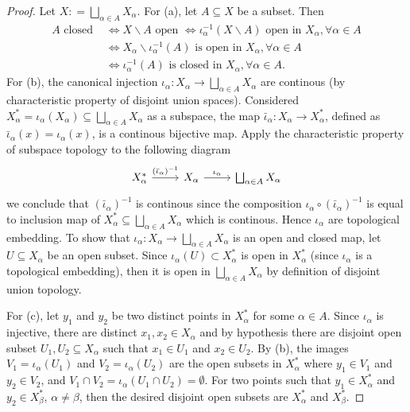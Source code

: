 \documentclass[a4paper]{article}
\theoremstyle{remark}
\newcommand{\subhim}{\subseteq} %
\begin{document}
\begin{proof}
	Let $X: = \bigsqcup_{\alpha \in A} X_{\alpha}$. For (a), let $A \subhim X$ be a subset. Then
	\begin{align*}
	A \text{ closed } &\Leftrightarrow X \smallsetminus A \text{ open } \Leftrightarrow \iota_{\alpha}^{-1}(X \smallsetminus A) \text{ open in }X_{\alpha}, \forall \alpha \in A  \\ &\Leftrightarrow X_{\alpha}\smallsetminus \iota_{\alpha}^{-1}(A) \text{ is open in }X_{\alpha}, \forall \alpha \in A \\
	&\Leftrightarrow \iota_{\alpha}^{-1}(A) \text{ is closed in }X_{\alpha}, \forall \alpha \in A.
	\end{align*}
	For (b), the canonical injection $\iota_{\alpha} : X_{\alpha} \to \bigsqcup_{\alpha \in A} X_{\alpha}$ are continous (by characteristic property of disjoint union spaces). Considered $X_{\alpha}^* = \iota_{\alpha} (X_{\alpha}) \subhim \bigsqcup_{\alpha \in A} X_{\alpha}$ as a subspace, the map $\bar{\iota}_{\alpha} : X_{\alpha} \to X_{\alpha}^*$, defined as $\bar{\iota}_{\alpha} (x) = \iota_{\alpha}(x)$, is a continous bijective map. Apply the characteristic property of subspace topology to the following diagram
	\[
	\begin{tikzcd}
	X^*_{\alpha} \arrow[r,"(\bar{\iota}_{\alpha})^{-1}"] &  X_{\alpha} \arrow[r,"\iota_{\alpha}"] & \bigsqcup_{\alpha \in A} X_{\alpha}
	\end{tikzcd}
	\]
	we conclude that $(\bar{\iota}_{\alpha})^{-1}$ is continous since the composition $\iota_{\alpha} \circ (\bar{\iota}_{\alpha})^{-1}$ is equal to inclusion map of $X^*_{\alpha} \subhim \bigsqcup_{\alpha \in A} X_{\alpha}$ which is continous. Hence $\iota_{\alpha}$ are topological embedding. To show that $\iota_{\alpha} : X_{\alpha} \to \bigsqcup_{\alpha \in A} X_{\alpha}$ is an open and closed map, let $U\subhim X_{\alpha}$ be an open subset. Since $\iota_{\alpha}(U) \subset X_{\alpha}^*$ is open in $X_{\alpha}^*$ (since $\iota_{\alpha}$ is a topological embedding), then it is open in $\bigsqcup_{\alpha \in A} X_{\alpha}$ by definition of disjoint union topology.   
	
	For (c),  let $y_1$ and $y_2$ be two distinct points in $X_{\alpha}^*$ for some $\alpha \in A$. Since $\iota_{\alpha}$ is injective, there are distinct $x_1,x_2 \in X_{\alpha}$ and by hypothesis there are disjoint open subset $U_1,U_2 \subhim X_{\alpha}$ such that $x_1 \in U_1$ and $x_2 \in U_2$. By (b), the images $V_1=\iota_{\alpha}(U_1)$ and $V_2=\iota_{\alpha}(U_2)$ are the open subsets in $X_{\alpha}^*$ where $y_1 \in V_1$ and $y_2 \in V_2$, and $V_1 \cap V_2 = \iota_{\alpha}(U_1 \cap U_2) = \emptyset$. For two points such that $y_1 \in X_{\alpha}^*$ and $y_2 \in X_{\beta}^*$, $\alpha \neq \beta$, then the desired disjoint open subsets are $X_{\alpha}^*$ and $X_{\beta}^*$.  
	

\end{proof}
\end{document}
